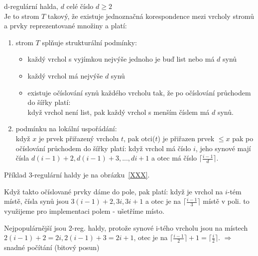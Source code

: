 \begin{defn}
d-regulární halda, $d$ celé číslo $d \geq 2$ \\
Je to strom $T$ takový, že existuje jednoznačná korespondence mezi vrcholy
stromů a prvky reprezentované množiny a platí:
\begin{enumerate}
\item strom $T$ splňuje strukturální podmínky:
  \begin{itemize}
    \item každý vrchol s vyjímkou nejvýše jednoho je buď list nebo má $d$ synů
    \item každý vrchol má nejvýše $d$ synů
    \item existuje očíslování synů každého vrcholu tak, že po očíslování
  	  průchodem do šířky platí: \\
	  když vrchol není list, pak každý vrchol s menším číslem má $d$
	  synů.
  \end{itemize}
  \item podmínku na lokální uspořádání: \\
	když $x$ je prvek přiřazený vrcholu $t$, pak otci($t$) je přiřazen
	prvek $\leq x$ pak po očíslování průchodem do šířky platí:
	když vrchol má číslo $i$, jeho synové mají čísla
	$d(i-1)+2,d(i-1)+3,...,di+1$ a otec má číslo 
	$\lceil\frac{i-1}{d}\rceil$.
\end{enumerate}
\end{defn}

\begin{priklad}
Příklad 3-regulární haldy je na obrázku~\ref{XXX}.


Když takto očíslované prvky dáme do pole, pak platí: když je vrchol na
$i$-tém místě, čísla synů jsou $3(i-1)+2, 3i, 3i+1$
a otec je na $\lceil\frac{i-1}{3}\rceil$ místě v poli.
to využijeme pro implementaci polem - ušetříme místo.
\end{priklad}

\begin{pozn}
Nejpopulárnější jsou 2-reg. haldy, protože synové i-tého vrcholu
jsou na místech $2(i-1)+2=2i, 2(i-1)+3=2i + 1$, otec je na
$\lceil\frac{i-1}{2}\rceil + 1 = \lceil\frac{i}{2}\rceil$. 
$\Rightarrow$ snadné počítání (bitový posun)
\end{pozn}

